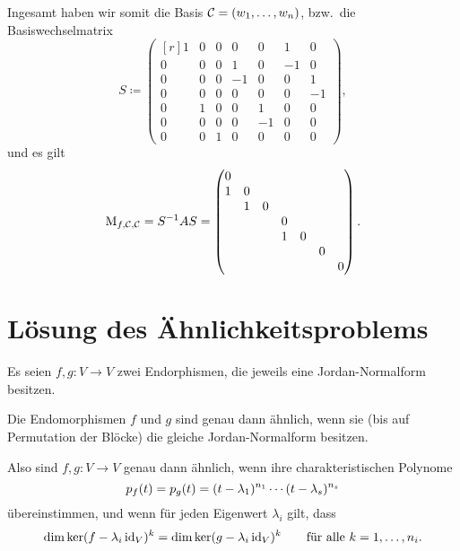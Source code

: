 \begin{example}
  Ingesamt haben wir somit die Basis $\mathcal{C} = (w_1, \dotsc, w_n)$, bzw.\ die Basiswechselmatrix
  \[
              S
    \coloneqq \begin{pmatrix*}[r]
                1 & 0 & 0 &  0  &  0  &  1  &  0  \\
                0 & 0 & 0 &  1  &  0  & -1  &  0  \\
                0 & 0 & 0 & -1  &  0  &  0  &  1  \\
                0 & 0 & 0 &  0  &  0  &  0  & -1  \\
                0 & 1 & 0 &  0  &  1  &  0  &  0  \\
                0 & 0 & 0 &  0  & -1  &  0  &  0  \\
                0 & 0 & 1 &  0  &  0  &  0  &  0
              \end{pmatrix*},
  \]
  und es gilt
  \[
      \operatorname{M}_{f, \mathcal{C}, \mathcal{C}}
    = S^{-1} A S
    = \begin{pmatrix}
        0 &   &   &   &   &   &   \\
        1 & 0 &   &   &   &   &   \\
          & 1 & 0 &   &   &   &   \\
          &   &   & 0 &   &   &   \\
          &   &   & 1 & 0 &   &   \\
          &   &   &   &   & 0 &   \\
          &   &   &   &   &   & 0
      \end{pmatrix}.
  \]
\end{example}



\pagebreak


\section{Lösung des Ähnlichkeitsproblems}

Es seien $f, g \colon V \to V$ zwei Endorphismen, die jeweils eine Jordan-Normalform besitzen.

\begin{theorem}
  Die Endomorphismen $f$ und $g$ sind genau dann ähnlich, wenn sie \textup(bis auf Permutation der Blöcke\textup) die gleiche Jordan-Normalform besitzen.
\end{theorem}

Also sind $f, g \colon V \to V$ genau dann ähnlich, wenn ihre charakteristischen Polynome
\[
    p_{f}(t)
  = p_{g}(t)
  = (t - \lambda_1)^{n_1} \dotsm (t - \lambda_s)^{n_s}
\]
übereinstimmen, und wenn für jeden Eigenwert $\lambda_i$ gilt, dass
\[
    \dim \ker (f - \lambda_i \operatorname{id}_V)^k
  = \dim \ker (g - \lambda_i \operatorname{id}_V)^k
  \qquad
  \text{für alle $k = 1, \dotsc, n_i$}.
\]

